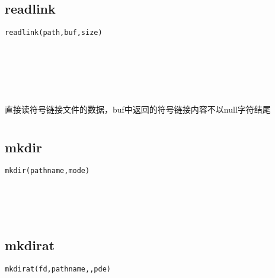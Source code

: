 \documentclass[10pt,a4paper]{article}
\begin{document}
\subsection{readlink}
\begin{spacing}{2.0}
\lstset{language=C,numbers=none}
\begin{lstlisting}
readlink(path,buf,size)
\end{lstlisting}
{\large\color[rgb]{0.2,0.4,0.6}{path:}} \\
{\large\color[rgb]{0.2,0.4,0.6}{buf:}} \\
{\large\color[rgb]{0.2,0.4,0.6}{size:}}
\paragraph{ \ \ }直接读符号链接文件的数据，buf中返回的符号链接内容不以null字符结尾
\end{spacing}

\section{\color[rgb]{0.2,0.4,0.6}{目录操作}}
\subsection{mkdir}
\begin{spacing}{2.0}
\lstset{language=C,numbers=none}
\begin{lstlisting}
mkdir(pathname,mode)
\end{lstlisting}
{\large\color[rgb]{0.2,0.4,0.6}{pathname:}} \\
{\large\color[rgb]{0.2,0.4,0.6}{mode:}}
\paragraph{ \ \ }
\end{spacing}

\subsection{mkdirat}
\begin{spacing}{2.0}
\lstset{language=C,numbers=none}
\begin{lstlisting}
mkdirat(fd,pathname,,pde)
\end{lstlisting}
{\large\color[rgb]{0.2,0.4,0.6}{fd:}} \\
{\large\color[rgb]{0.2,0.4,0.6}{pathname:}} \\
{\large\color[rgb]{0.2,0.4,0.6}{:}} \\
{\large\color[rgb]{0.2,0.4,0.6}{pde:}}
\paragraph{ \ \ }
\end{spacing}
\end{document}
